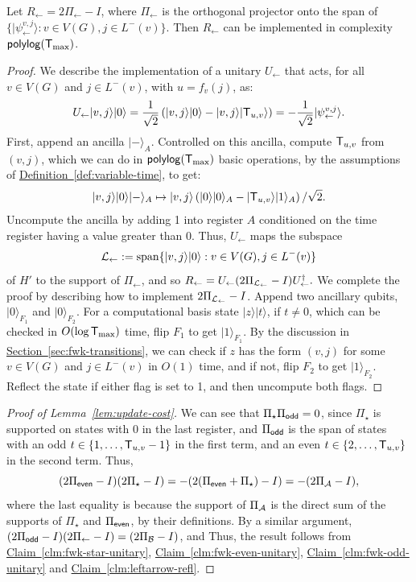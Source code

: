 \documentclass{theoretics}
\renewcommand{\sec}[1]{\hyperref[sec:#1]{Section~\ref*{sec:#1}}}
\newcommand{\defin}[1]{\hyperref[def:#1]{Definition~\ref*{def:#1}}}
\newcommand{\clm}[1]{\hyperref[clm:#1]{Claim~\ref*{clm:#1}}}
\def\ket#1{{\lvert}#1\rangle}
\renewcommand{\>}{\rangle}
\newcommand{\<}{\langle}
\renewcommand{\(}{\left(}
\renewcommand{\)}{\right)}
\begin{document}
\begin{claim}\label{clm:leftarrow-refl}
Let $R_{\leftarrow} =2\Pi_{\leftarrow}-I$, where $\Pi_{\leftarrow}$ is the orthogonal projector onto the span of
$\{\ket{\psi_{\leftarrow}^{v,j}}:v\in V(G),j\in L^-(v)\}.$
Then $R_{\leftarrow}$ can be implemented in complexity ${\sf polylog}({\sf T}_{\max})$. 
\end{claim}
\begin{proof}
We describe the implementation of a unitary $U_{\leftarrow}$ that acts, for all $v\in V(G)$ and $j\in L^-(v)$, with $u=f_v(j)$, as:
$$U_{\leftarrow}\ket{v,j}\ket{0} = \frac{1}{\sqrt{2}}\left(
	\ket{v,j}\ket{0}-\ket{v,j}\ket{{\sf T}_{u,v}}
\right)
=-\frac{1}{\sqrt{2}}\ket{\psi_{\leftarrow}^{v,j}}.$$
First, append an ancilla $\ket{-}_A$. Controlled on this ancilla, compute ${\sf T}_{u,v}$ from $(v,j)$, which we can do in ${\sf polylog}({\sf T}_{\max})$ basic operations, by the assumptions of \defin{variable-time}, to get:
$$\ket{v,j}\ket{0}\ket{-}_A \mapsto \ket{v,j}\left(\ket{0}\ket{0}_A - \ket{{\sf T}_{u,v}}\ket{1}_A\right)/\sqrt{2}.$$
Uncompute the ancilla by adding 1 into register $A$ conditioned on the time register having a value greater than 0. Thus, $U_{\leftarrow}$ maps the subspace
$${\cal L}_{\leftarrow}:=\mathrm{span}\{\ket{v,j}\ket{0}:v\in V(G), j\in L^-(v)\}$$
of $H'$ to the support of $\Pi_{\leftarrow}$, and so
$R_{\leftarrow} = U_{\leftarrow}(2\Pi_{{\cal L}_\leftarrow}-I)U_{\leftarrow}^\dagger.$
We complete the proof by describing how to implement $2\Pi_{{\cal L}_\leftarrow}-I$. Append two ancillary qubits, $\ket{0}_{F_1}$ and $\ket{0}_{F_2}$. For a computational basis state $\ket{z}\ket{t}$, if $t\neq 0$, which can be checked in $O(\log {\sf T}_{\max})$ time, flip $F_1$ to get $\ket{1}_{F_1}$. By the discussion in \sec{fwk-transitions}, we can check if $z$ has the form $(v,j)$ for some $v\in V(G)$ and $j\in L^-(v)$ in $O(1)$ time, and if not, flip $F_2$ to get $\ket{1}_{F_2}$. Reflect the state if either flag is set to 1, and then uncompute both flags.
\end{proof}


\begin{proof}[Proof of Lemma~\ref{lem:update-cost}]
We can see that $\Pi_\star\Pi_{\sf odd}=0$, since $\Pi_\star$ is supported on states with $0$ in the last register, and $\Pi_{\sf odd}$ is the span of states with an odd $t\in \{1,\dots,{\sf T}_{u,v}-1\}$ in the first term, and an even $t\in\{2,\dots,{\sf T}_{u,v}\}$ in the second term. Thus, 
$$(2\Pi_{\sf even}-I)(2\Pi_\star-I)=-(2(\Pi_{\sf even}+\Pi_\star)-I) = -(2\Pi_{\cal A}-I),$$
where the last equality is because the support of $\Pi_{\cal A}$ is the direct sum of the supports of $\Pi_\star$ and $\Pi_{\sf even}$, by their definitions. 
By a similar argument, $(2\Pi_{\sf odd}-I)(2\Pi_{\leftarrow}-I)=(2\Pi_{\cal B}-I)$, and Thus, the result follows from \clm{fwk-star-unitary}, \clm{fwk-even-unitary}, \clm{fwk-odd-unitary} and \clm{leftarrow-refl}.
\end{proof}
\end{document}
